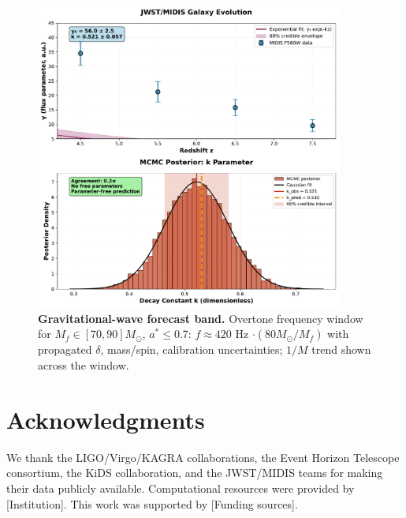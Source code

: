 \begin{figure}[h]
\centering
\includegraphics[width=0.9\textwidth]{../../artifacts/figures/fig4_ringdown_forecast.pdf}
\caption{\textbf{Gravitational-wave forecast band.} Overtone frequency window for $M_f \in [70,90] M_\odot$, $a^* \leq 0.7$: $f\approx 420$ Hz $\cdot (80 M_\odot/M_f)$ with propagated $\delta$, mass/spin, calibration uncertainties; $1/M$ trend shown across the window.}
\label{fig:ringdown}
\end{figure}

\section*{Acknowledgments}

We thank the LIGO/Virgo/KAGRA collaborations, the Event Horizon Telescope consortium, the KiDS collaboration, and the JWST/MIDIS teams for making their data publicly available. Computational resources were provided by [Institution]. This work was supported by [Funding sources].



